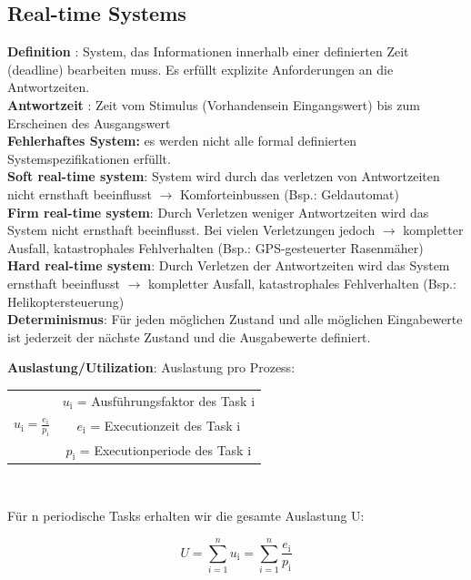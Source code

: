 \subsection{Real-time Systems}
\textbf{Definition} : System, das Informationen innerhalb einer definierten Zeit
(deadline) bearbeiten muss. Es erfüllt explizite Anforderungen an die
Antwortzeiten.\\
\textbf{Antwortzeit} : Zeit vom Stimulus (Vorhandensein
Eingangswert) bis zum Erscheinen des Ausgangswert\\
\textbf{Fehlerhaftes System:} es werden nicht alle formal definierten Systemspezifikationen erfüllt.\\
\textbf{Soft real-time system}: System wird durch das verletzen von
Antwortzeiten nicht ernsthaft beeinflusst $\rightarrow$ Komforteinbussen (Bsp.:
Geldautomat)\\
\textbf{Firm real-time system}: Durch Verletzen weniger Antwortzeiten wird das
System nicht ernsthaft beeinflusst. Bei vielen Verletzungen jedoch $\rightarrow$
kompletter Ausfall, katastrophales Fehlverhalten (Bsp.: GPS-gesteuerter
Rasenmäher)\\
\textbf{Hard real-time system}: Durch Verletzen der Antwortzeiten wird das
System ernsthaft beeinflusst $\rightarrow$ kompletter Ausfall, katastrophales
Fehlverhalten (Bsp.: Helikoptersteuerung)\\
\textbf{Determinismus}: Für jeden möglichen Zustand und alle möglichen
Eingabewerte ist jederzeit der nächste Zustand und die Ausgabewerte definiert.

\begin{multicols}{2}
\textbf{Auslastung/Utilization}: 
Auslastung pro Prozess:
\begin{center}  
\begin{tabular}{c c}
& $u_\text{i}$ = Ausführungsfaktor des Task i\\
$u_\text{i} = \frac{e_\text{i}}{p_\text{i}}$&$e_\text{i}$ = Executionzeit des
Task i\\
& $p_\text{i}$ = Executionperiode des Task i
\end{tabular}\\
\end{center}

\columnbreak

Für n periodische Tasks erhalten wir die gesamte Auslastung U: 
\begin{center}
\begin{equation}
U = \sum_{i=1}^{n}u_\text{i} = \sum_{i=1}^{n}\frac{e_\text{i}}{p_\text{i}}
\end{equation}
\end{center}
\end{multicols}

